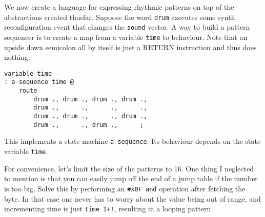 \documentclass[12pt]{article}
\begin{document}
We now create a language for expressing rhythmic patterns on top of
the abstractions created thusfar. Suppose the word \verb|drum|
executes some synth reconfiguration event that changes the
\verb|sound| vector. A way to build a pattern sequencer is to create a
map from a variable \verb|time| to behaviour. Note that an upside down
semicolon all by itself is just a RETURN instruction and thus does
nothing.
\begin{samepage}
\begin{verbatim}
variable time
: a-sequence time @
    route
        drum ., drum ., drum ., drum .,
        drum .,      .,      .,      .,
        drum ., drum .,      ., drum .,
        drum .,      ., drum .,      ;
\end{verbatim}
\end{samepage}
This implements a state machine \verb|a-sequence|. Its behaviour
depends on the state variable \verb|time|.

For convenience, let's limit the size of the patterns to 16. One thing
I neglected to mention is that you can easily jump off the end of a
jump table if the number is too big. Solve this by performing an
\verb|#x0F and| operation after fetching the byte. In that case one
never has to worry about the value being out of range, and
incrementing time is just \verb|time 1+!|, resulting in a looping
pattern.
\end{document}
